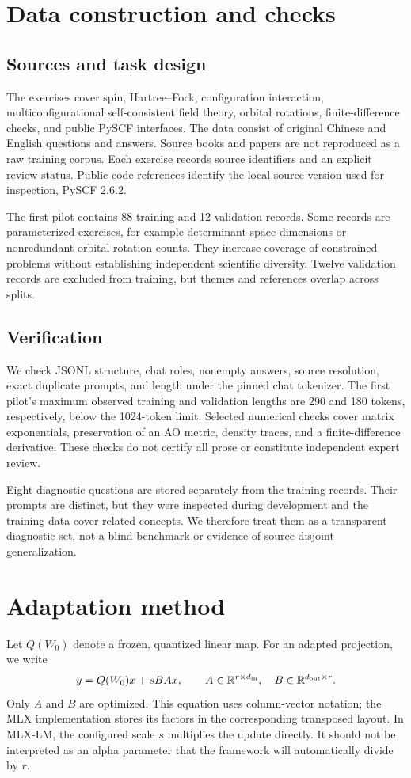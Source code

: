 \documentclass[11pt]{article}
\begin{document}
\section{Data construction and checks}
\subsection{Sources and task design}
The exercises cover spin, Hartree--Fock, configuration interaction,
multiconfigurational self-consistent field theory, orbital rotations,
finite-difference checks, and public PySCF interfaces. The data consist of
original Chinese and English questions and answers. Source books and papers
are not reproduced as a raw training corpus. Each exercise records source
identifiers and an explicit review status. Public code references identify
the local source version used for inspection, PySCF 2.6.2.

The first pilot contains 88 training and 12 validation records. Some records are
parameterized exercises, for example determinant-space dimensions or
nonredundant orbital-rotation counts. They increase coverage of constrained
problems without establishing independent scientific diversity. Twelve
validation records are excluded from training, but themes and references
overlap across splits.

\subsection{Verification}
We check JSONL structure, chat roles, nonempty answers, source resolution,
exact duplicate prompts, and length under the pinned chat tokenizer.
The first pilot's maximum observed training and validation lengths are 290 and 180 tokens,
respectively, below the 1024-token limit. Selected numerical checks
cover matrix exponentials, preservation of an AO metric, density traces,
and a finite-difference derivative. These checks do not certify all prose
or constitute independent expert review.

Eight diagnostic questions are stored separately from the training records.
Their prompts are distinct, but they were inspected during development and
the training data cover related concepts. We therefore treat them as a
transparent diagnostic set, not a blind benchmark or evidence of
source-disjoint generalization.

\section{Adaptation method}
Let $Q(W_0)$ denote a frozen, quantized linear map. For an adapted projection,
we write
\begin{equation}
 y = Q(W_0)x + sBAx,
 \qquad A\in\mathbb{R}^{r\times d_{\rm in}},\quad
 B\in\mathbb{R}^{d_{\rm out}\times r}.
\end{equation}
Only $A$ and $B$ are optimized. This equation uses column-vector notation;
the MLX implementation stores its factors in the corresponding transposed
layout. In MLX-LM, the configured scale $s$ multiplies the update directly.
It should not be interpreted as an alpha parameter that the framework will
automatically divide by $r$.
\end{document}
